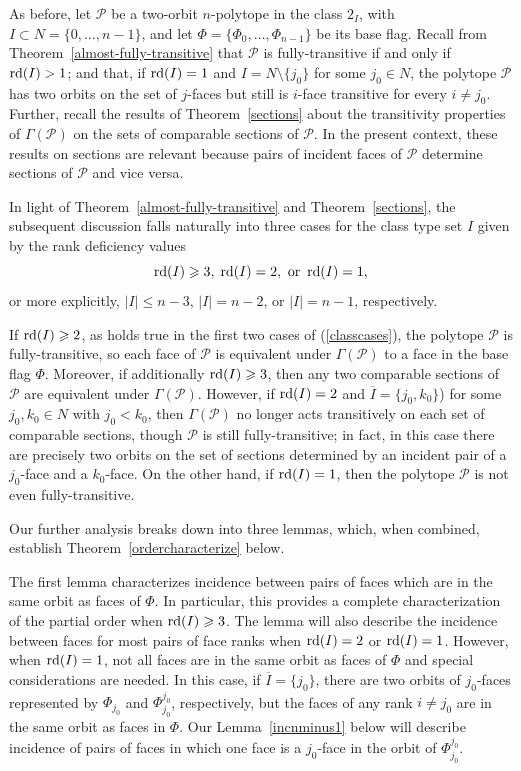 \documentclass[12pt]{article}
\renewcommand{\bar}{\overline}
\renewcommand{\>}{\rangle}
\renewcommand{\leq}{\leqslant}
\renewcommand{\geq}{\geqslant}
\theoremstyle{definition}\newtheorem{definition}{Definition}[section]
\begin{document}
As before, let $\mathcal{P}$ be a two-orbit $n$-polytope in the class $2_I$, with $I\subset N=\{0,\ldots,n-1\}$, and let $\Phi=\{\Phi_0,\ldots,\Phi_{n-1}\}$ be its base flag. Recall from Theorem~\ref{almost-fully-transitive} that $\mathcal{P}$ is fully-transitive if and only if 
${\rm rd}(I)>1$; and that, if ${\rm rd}(I)=1$ and $I = N\setminus \{j_0\}$ for some $j_0\in N$, the polytope $\mathcal{P}$ has two orbits on the set of $j$-faces but still is $i$-face transitive for every $i\neq j_0$. Further, recall the results of Theorem~\ref{sections} about the transitivity properties of $\Gamma(\mathcal{P})$ on the sets of comparable sections of $\mathcal{P}$. In the present context, these results on sections are relevant because pairs of incident faces of $\mathcal{P}$ determine sections of $\mathcal{P}$ and vice versa.

In light of Theorem~\ref{almost-fully-transitive} and Theorem~\ref{sections}, the subsequent discussion falls naturally into three cases for the class type set $I$ given by the rank deficiency values 
\begin{equation}
\label{classcases}
{\rm rd}(I)\geq 3,\; {\rm rd}(I)=2, \mbox{ or }\,{\rm rd}(I)=1,
\end{equation}
or more explicitly, $|I| \leq n-3$, $|I| = n-2$, or $|I|=n-1$, respectively.

If ${\rm rd}(I)\geq 2$, as holds true in the first two cases of (\ref{classcases}), the polytope $\mathcal{P}$ is fully-transitive, so each face of $\mathcal{P}$ is equivalent under $\Gamma(\mathcal{P})$ to a face in the base flag $\Phi$. Moreover, if additionally ${\rm rd}(I)\geq 3$, then any two comparable sections of $\mathcal{P}$ are equivalent under $\Gamma(\mathcal{P})$.
However, if ${\rm rd}(I)=2$ and $\bar{I}=\{j_0,k_0\}$) for some $j_0,k_0 \in N$ with $j_{0}<k_0$, then $\Gamma(\mathcal{P})$ no longer acts transitively on each set of comparable sections, though $\mathcal{P}$ is still fully-transitive; in fact, in this case there are precisely two orbits on the set of sections determined by an incident pair of a $j_0$-face and a $k_0$-face. On the other hand, if ${\rm rd}(I)=1$, then the polytope $\mathcal{P}$ is not even fully-transitive.
\medskip

Our further analysis breaks down into three lemmas, which, when combined, establish Theorem~\ref{ordercharacterize} below. 
\smallskip

The first lemma characterizes incidence between pairs of faces which are in the same orbit as faces of $\Phi$. In particular, this provides a complete characterization of the partial order when ${\rm rd}(I)\geq 3$. The lemma will also describe the incidence between faces for most pairs of face ranks when ${\rm rd}(I)=2$ or ${\rm rd}(I)=1$. However, when ${\rm rd}(I)=1$, not all faces are in the same orbit as faces of $\Phi$ and special considerations are needed. In this case, if $\bar{I}=\{j_0\}$, there are two orbits of $j_0$-faces represented by $\Phi_{j_0}$ and $\Phi_{j_0}^{j_0}$, respectively, but the faces of any rank $i\neq j_0$ are in the same orbit as faces in $\Phi$. Our Lemma~\ref{incnminus1} below will describe incidence of pairs of faces in which one face is a $j_0$-face in the orbit of $\Phi_{j_0}^{j_0}$.
\end{document}
